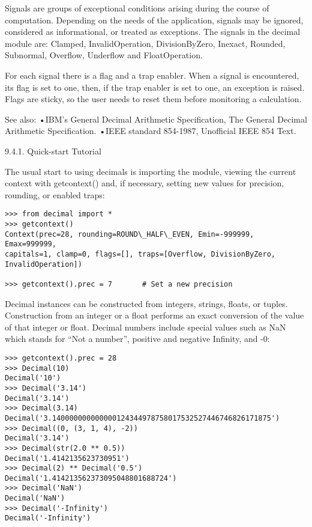 Signals are groups of exceptional conditions arising during the course of computation. Depending on the needs of the application, signals may be ignored, considered as informational, or treated as exceptions. The signals in the decimal module are: Clamped, InvalidOperation, DivisionByZero, Inexact, Rounded, Subnormal, Overflow, Underflow and FloatOperation.

For each signal there is a flag and a trap enabler. When a signal is encountered, its flag is set to one, then, if the trap enabler is set to one, an exception is raised. Flags are sticky, so the user needs to reset them before monitoring a calculation.

See also:
•IBM’s General Decimal Arithmetic Specification, The General Decimal Arithmetic Specification.
•IEEE standard 854-1987, Unofficial IEEE 854 Text.


9.4.1. Quick-start Tutorial

The usual start to using decimals is importing the module, viewing the current context with getcontext() and, if necessary, setting new values for precision, rounding, or enabled traps:

\begin{lstlisting}
>>> from decimal import *
>>> getcontext()
Context(prec=28, rounding=ROUND\_HALF\_EVEN, Emin=-999999, Emax=999999,
capitals=1, clamp=0, flags=[], traps=[Overflow, DivisionByZero, 
InvalidOperation])

>>> getcontext().prec = 7       # Set a new precision
\end{lstlisting}

Decimal instances can be constructed from integers, strings, floats, or tuples. Construction from an integer or a float performs an exact conversion of the value of that integer or float. Decimal numbers include special values such as NaN which stands for “Not a number”, positive and negative Infinity, and -0:

\begin{lstlisting}
>>> getcontext().prec = 28
>>> Decimal(10)
Decimal('10')
>>> Decimal('3.14')
Decimal('3.14')
>>> Decimal(3.14)
Decimal('3.140000000000000124344978758017532527446746826171875')
>>> Decimal((0, (3, 1, 4), -2))
Decimal('3.14')
>>> Decimal(str(2.0 ** 0.5))
Decimal('1.4142135623730951')
>>> Decimal(2) ** Decimal('0.5')
Decimal('1.414213562373095048801688724')
>>> Decimal('NaN')
Decimal('NaN')
>>> Decimal('-Infinity')
Decimal('-Infinity')
\end{lstlisting}

